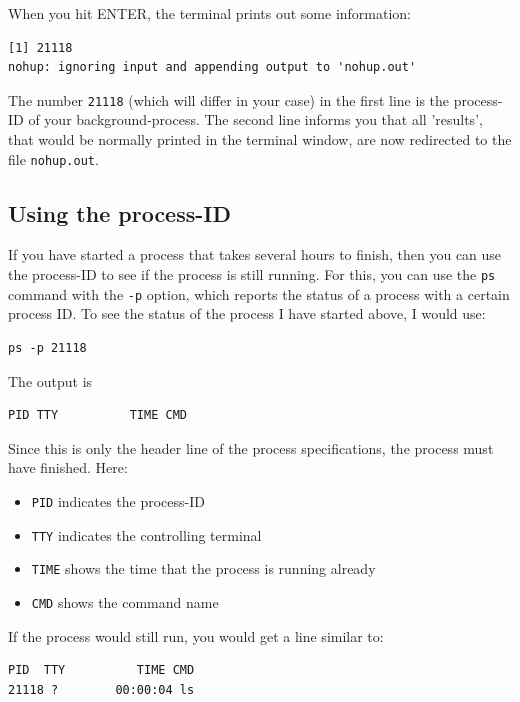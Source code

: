 \documentclass[11pt]{article}
\begin{document}
When you hit ENTER, the terminal prints out some information:

\begin{verbatim}
[1] 21118
nohup: ignoring input and appending output to 'nohup.out'
\end{verbatim}

The number \texttt{21118} (which will differ in your case) in the first line
is the process-ID of your background-process. The second line informs you that
all 'results', that would be normally printed in the terminal window,
are now redirected to the file \texttt{nohup.out}. 

\subsection{Using the process-ID}
\label{sec-5-1}
If you have started a process that takes several hours
to finish, then you can use the process-ID to see if the process is
still running. For this, you can use the \texttt{ps} command with the \texttt{-p}
option, which reports the status of a process with a certain process
ID. To see the status of the process I have started above, I would
use:

\begin{verbatim}
ps -p 21118
\end{verbatim}

The output is

\begin{verbatim}
PID TTY          TIME CMD
\end{verbatim}

Since this is only the header line of the process specifications, the
process must have finished. 
Here:
\begin{itemize}
\item \texttt{PID} indicates the process-ID
\item \texttt{TTY} indicates the controlling terminal
\item \texttt{TIME} shows the time that the process is running already
\item \texttt{CMD} shows the command name
\end{itemize}

If the process would still run, you would
get a line similar to:

\begin{verbatim}
PID  TTY          TIME CMD
21118 ?        00:00:04 ls
\end{verbatim}
\end{document}
